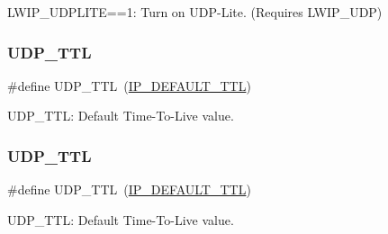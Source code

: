 L\+W\+I\+P\+\_\+\+U\+D\+P\+L\+I\+TE==1\+: Turn on U\+D\+P-\/\+Lite. (Requires L\+W\+I\+P\+\_\+\+U\+DP) \mbox{\label{group__lwip__opts__udp_ga97908a317bcba89174b5d1ccbdca0096}} 
\subsubsection{\texorpdfstring{U\+D\+P\+\_\+\+T\+TL}{UDP\_TTL}\hspace{0.1cm}{\footnotesize\ttfamily [1/2]}}
{\footnotesize\ttfamily \#define U\+D\+P\+\_\+\+T\+TL~(\hyperlink{group__lwip__opts__ipv4_ga556b9b58fd02c0fdd126791baef77411}{I\+P\+\_\+\+D\+E\+F\+A\+U\+L\+T\+\_\+\+T\+TL})}

U\+D\+P\+\_\+\+T\+TL\+: Default Time-\/\+To-\/\+Live value. \mbox{\label{group__lwip__opts__udp_ga97908a317bcba89174b5d1ccbdca0096}} 
\subsubsection{\texorpdfstring{U\+D\+P\+\_\+\+T\+TL}{UDP\_TTL}\hspace{0.1cm}{\footnotesize\ttfamily [2/2]}}
{\footnotesize\ttfamily \#define U\+D\+P\+\_\+\+T\+TL~(\hyperlink{group__lwip__opts__ipv4_ga556b9b58fd02c0fdd126791baef77411}{I\+P\+\_\+\+D\+E\+F\+A\+U\+L\+T\+\_\+\+T\+TL})}

U\+D\+P\+\_\+\+T\+TL\+: Default Time-\/\+To-\/\+Live value. 